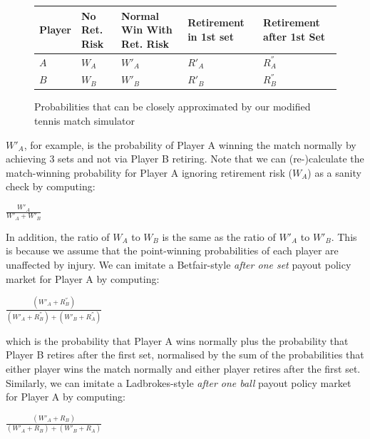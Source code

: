 \documentclass[letterpaper,12pt]{article}
\begin{document}
\begin{figure}[H]
	\begin{center}
	\renewcommand{\arraystretch}{1.8}
		\begin{tabular}{|C{1.2cm}|C{1.4cm}|C{2.8cm}|C{2.4cm}|C{2.4cm}|}
			\hline
			\textbf{Player} & \textbf{No Ret. Risk} & \textbf{Normal Win With Ret. Risk} & \textbf{Retirement in 1st set} & \textbf{Retirement after 1st Set} \\ \hline
			$A$ & $W_A$ & $W'_A$ & $R'_A$ & $R^{''}_A$ \\ \hline
			$B$ & $W_B$ & $W'_B$ & $R'_B$ & $R^{''}_B$ \\ \hline
		\end{tabular}
	\renewcommand{\arraystretch}{1}
	\end{center}
	\caption{Probabilities that can be closely approximated by our modified tennis match simulator}
	\label{outcomes}
\end{figure}

$W'_A$, for example, is the probability of Player A winning the match normally by achieving 3 sets and not via Player B retiring.  Note that we can (re-)calculate the match-winning probability for Player A ignoring retirement risk ($W_A$) as a sanity check by computing:

\begin{center}
	$\frac{W'_A}{W'_A + W'_B}$
\end{center}

In addition, the ratio of $W_A$ to $W_B$ is the same as the ratio of $W'_A$ to $W'_B$.  This is because we assume that the point-winning probabilities of each player are unaffected by injury.  We can imitate a Betfair-style \textit{after one set} payout policy market for Player A by computing:

\begin{center}
	$\frac{(W'_A + R^{''}_B)}{(W'_A + R^{''}_B) + (W'_B + R^{''}_A)}$
\end{center}

which is the probability that Player A wins normally plus the probability that Player B retires after the first set, normalised by the sum of the probabilities that either player wins the match normally and either player retires after the first set.  Similarly, we can imitate a Ladbrokes-style \textit{after one ball} payout policy market for Player A by computing:

\begin{center}
	$\frac{(W'_A + R_B)}{(W'_A + R_B) + (W'_B + R_A)}$
\end{center}
\end{document}
